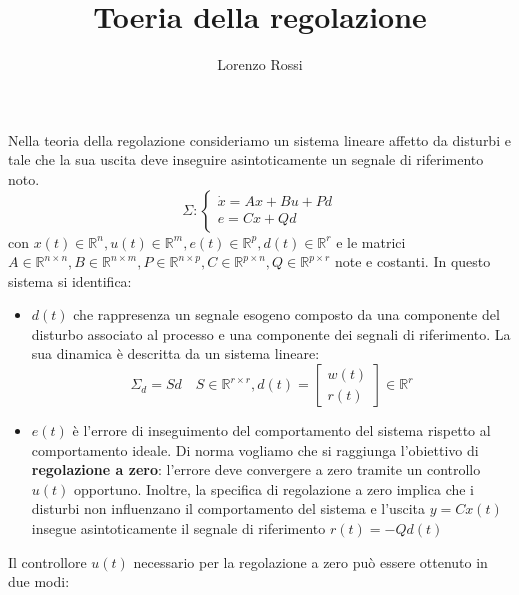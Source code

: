 \documentclass{article}
\title{Toeria della regolazione}
\author{Lorenzo Rossi}
\theoremstyle{definition}
\begin{document}
\maketitle
Nella teoria della regolazione consideriamo un sistema lineare affetto da disturbi e tale che la sua uscita deve inseguire asintoticamente un segnale di riferimento noto.
\begin{equation*}
	\Sigma:\begin{cases}
		\dot{x}=Ax+Bu+Pd \\
		e=Cx+Qd
	\end{cases}
\end{equation*}
con \(x(t)\in\mathbb{R}^{n},u(t)\in\mathbb{R}^{m},e(t)\in\mathbb{R}^{p},d(t)\in\mathbb{R}^{r}\) e le matrici \(A\in\mathbb{R}^{n\times n},B\in\mathbb{R}^{n\times m},P\in\mathbb{R}^{n\times p},C\in\mathbb{R}^{p\times n},Q\in\mathbb{R}^{p\times r}\) note e costanti.\newline
In questo sistema si identifica:
\begin{itemize}
	\item \(d(t)\) che rappresenza un segnale esogeno composto da una componente del disturbo associato al processo e una componente dei segnali di riferimento. La sua dinamica è descritta da un sistema lineare:\begin{equation*}
		      \Sigma_{d}=S d\quad S\in\mathbb{R}^{r\times r},d(t)=\begin{bmatrix}
			      w(t) \\r(t)
		      \end{bmatrix}\in\mathbb{R}^{r}
	      \end{equation*}
	\item \(e(t)\) è l'errore di inseguimento del comportamento del sistema rispetto al comportamento ideale. Di norma vogliamo che si raggiunga l'obiettivo di \textbf{regolazione a zero}: l'errore deve convergere a zero tramite un controllo \(u(t)\) opportuno. Inoltre, la specifica di regolazione a zero implica che i disturbi non influenzano il comportamento del sistema e l'uscita \(y=Cx(t)\) insegue asintoticamente il segnale di riferimento \(r(t)=-Q d(t)\)
\end{itemize}
Il controllore \(u(t)\) necessario per la regolazione a zero può essere ottenuto in due modi:
\end{document}
